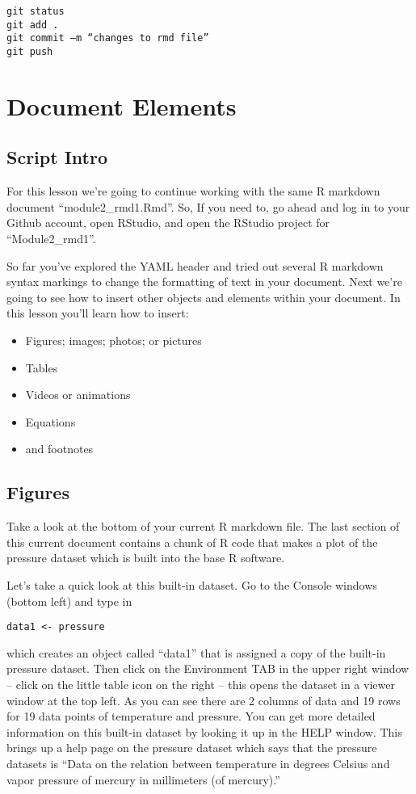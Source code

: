 \documentclass[]{book}
\providecommand{\tightlist}{%
  \setlength{\itemsep}{0pt}\setlength{\parskip}{0pt}}
\theoremstyle{definition}
\theoremstyle{definition}
\theoremstyle{definition}
\theoremstyle{remark}
\begin{document}
\begin{verbatim}
git status
git add .
git commit –m “changes to rmd file”
git push
\end{verbatim}

\chapter{Document Elements}\label{docelements}

\section{Script Intro}\label{script-intro}

For this lesson we're going to continue working with the same R markdown
document ``module2\_rmd1.Rmd''. So, If you need to, go ahead and log in
to your Github account, open RStudio, and open the RStudio project for
``Module2\_rmd1''.

So far you've explored the YAML header and tried out several R markdown
syntax markings to change the formatting of text in your document. Next
we're going to see how to insert other objects and elements within your
document. In this lesson you'll learn how to insert:

\begin{itemize}
\tightlist
\item
  Figures; images; photos; or pictures
\item
  Tables
\item
  Videos or animations
\item
  Equations
\item
  and footnotes
\end{itemize}

\section{Figures}\label{figures}

Take a look at the bottom of your current R markdown file. The last
section of this current document contains a chunk of R code that makes a
plot of the pressure dataset which is built into the base R software.

Let's take a quick look at this built-in dataset. Go to the Console
windows (bottom left) and type in

\texttt{data1\ \textless{}-\ pressure}

which creates an object called ``data1'' that is assigned a copy of the
built-in pressure dataset. Then click on the Environment TAB in the
upper right window -- click on the little table icon on the right --
this opens the dataset in a viewer window at the top left. As you can
see there are 2 columns of data and 19 rows for 19 data points of
temperature and pressure. You can get more detailed information on this
built-in dataset by looking it up in the HELP window. This brings up a
help page on the pressure dataset which says that the pressure datasets
is ``Data on the relation between temperature in degrees Celsius and
vapor pressure of mercury in millimeters (of mercury).''
\end{document}
